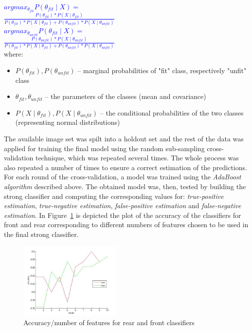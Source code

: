 \documentclass[11pt,twocolumn]{article}
\begin{document}
\begin{flushleft}
\selectfont\small
\textcolor{blue}{
$argmax_{\theta_{fit}}P(\theta_{fit}\mid X) = $\\[3pt]
\hspace*{70px}$\frac{P(\theta_{fit})*P(X\mid \theta_{fit})}{P(\theta_{fit})*P(X\mid \theta_{fit}) + P(\theta_{unfit})*P(X\mid \theta_{unfit})}$\\[5pt]
$argmax_{\theta_{unfit}}P(\theta_{fit}\mid X) = $\\[3pt]
\hspace*{70px}$\frac{P(\theta_{unfit})*P(X\mid \theta_{unfit})}{P(\theta_{fit})*P(X\mid \theta_{fit}) + P(\theta_{unfit})*P(X\mid \theta_{unfit})}$\\[5pt]}
where:
\begin{itemize}
\item $P(\theta_{fit}), P(\theta_{unfit})$ -- marginal probabilities of "fit" class, respectively "unfit" class
\item $\theta_{fit}, \theta_{unfit}$ -- the parameters of the classes (mean and covariance) 
\item $P(X\mid \theta_{fit}),P(X\mid \theta_{unfit})$ -- the conditional probabilities of the two classes (representing normal distributions)
\end{itemize}
\end{flushleft}
	\hspace*{10px}The available image set was spilt into a holdout set and the rest of the data was applied for training the final model using the random sub-sampling cross-validation technique, which was repeated several times. The whole process was also repeated a number of times to ensure a correct estimation of the predictions. For each round of the cross-validation, a model was trained using the \emph{AdaBoost algorithm} described above. The obtained model was, then, tested by building the strong classifier and computing the corresponding values for: \emph{true-positive estimation}, \emph{true-negative estimation}, \emph{false-positive estimation} and \emph{false-negative estimation}. In Figure~\ref{nr_models} is depicted the plot of the accuracy of the classifiers for front and rear corresponding to different numbers of features chosen to be used in the final strong classifier.\\ 
\begin{figure}[!hbtp]
\centering
\includegraphics[width=0.45\textwidth]{img/nr_features.jpg}
\caption{Accuracy/number of features for rear and front classifiers}
\label{nr_models}
\end{figure}
\end{document}
